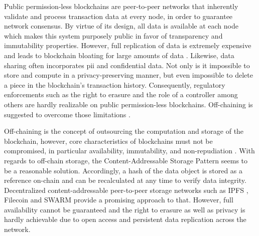 Public permission-less blockchains are peer-to-peer networks that inherently validate and process transaction data at every node, in order to guarantee network consensus. By virtue of its design, all data is available at each node which makes this system purposely public in favor of transparency and immutability properties. However, full replication of data is extremely expensive and leads to blockchain bloating for large amounts of data \cite{eberhardtBlockchainInsightsOffChaining2017}. Likewise, data sharing often incorporates \acrshort{pii} and confidential data. Not only is it impossible to store and compute in a privacy-preserving manner, but even impossible to delete a piece in the blockchain's transaction history. Consequently, regulatory enforcements such as the right to erasure \cite[Art. 17]{european_commission_regulation_2016} and the role of a controller \cite[Art. 4 (7)]{european_commission_regulation_2016} among others are hardly realizable on public permission-less blockchains. Off-chaining is suggested to overcome those limitations \cite{eberhardtBlockchainInsightsOffChaining2017}.

Off-chaining is the concept of outsourcing the computation and storage of the blockchain, however, core characteristics of blockchains must not be compromised, in particular availability, immutability, and non-repudiation \cite{eberhardtOffchainingModelsApproaches2018,eberhardtBlockchainInsightsOffChaining2017}. With regards to off-chain storage, the Content-Addressable Storage Pattern \cite{eberhardtBlockchainInsightsOffChaining2017} seems to be a reasonable solution. Accordingly, a hash of the data object is stored as a reference on-chain and can be recalculated at any time to verify data integrity. Decentralized content-addressable peer-to-peer storage networks such as IPFS \cite{benetIPFSContentAddressed2014}, Filecoin \cite{filecoin} and SWARM \cite{swarm} provide a promising approach to that. However, full availability cannot be guaranteed \cite{eberhardtOffchainingModelsApproaches2018} and the right to erasure \cite[Art. 17]{european_commission_regulation_2016} as well as privacy is hardly achievable due to open access and persistent data replication across the network.

